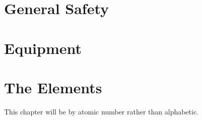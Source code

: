 \documentclass{book}
\begin{document}
\chapter{General Safety}

\chapter{Equipment}

\chapter{The Elements}
This chapter will be by atomic number rather than alphabetic.






















































\end{document}

